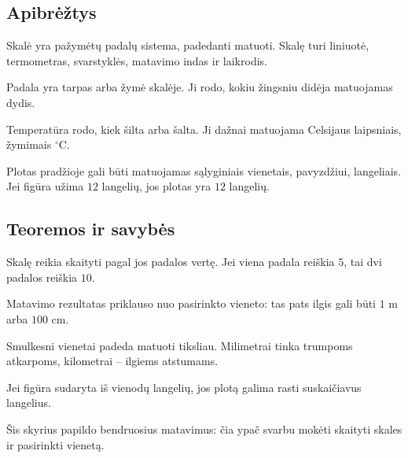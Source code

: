 \subsection{Apibrėžtys}

\begin{apibreztis}
Skalė yra pažymėtų padalų sistema, padedanti matuoti. Skalę turi liniuotė, termometras, svarstyklės, matavimo indas ir laikrodis.
\end{apibreztis}

\begin{apibreztis}
Padala yra tarpas arba žymė skalėje. Ji rodo, kokiu žingsniu didėja matuojamas dydis.
\end{apibreztis}

\begin{apibreztis}
Temperatūra rodo, kiek šilta arba šalta. Ji dažnai matuojama Celsijaus laipsniais, žymimais \({}^{\circ}\text{C}\).
\end{apibreztis}

\begin{apibreztis}
Plotas pradžioje gali būti matuojamas sąlyginiais vienetais, pavyzdžiui, langeliais. Jei figūra užima \(12\) langelių, jos plotas yra \(12\) langelių.
\end{apibreztis}

\subsection{Teoremos ir savybės}

\begin{savybe}
Skalę reikia skaityti pagal jos padalos vertę. Jei viena padala reiškia \(5\), tai dvi padalos reiškia \(10\).
\end{savybe}

\begin{savybe}
Matavimo rezultatas priklauso nuo pasirinkto vieneto: tas pats ilgis gali būti \(1\) m arba \(100\) cm.
\end{savybe}

\begin{savybe}
Smulkesni vienetai padeda matuoti tiksliau. Milimetrai tinka trumpoms atkarpoms, kilometrai -- ilgiems atstumams.
\end{savybe}

\begin{savybe}
Jei figūra sudaryta iš vienodų langelių, jos plotą galima rasti suskaičiavus langelius.
\end{savybe}

\begin{pastaba}
Šis skyrius papildo bendruosius matavimus: čia ypač svarbu mokėti skaityti skales ir pasirinkti vienetą.
\end{pastaba}

